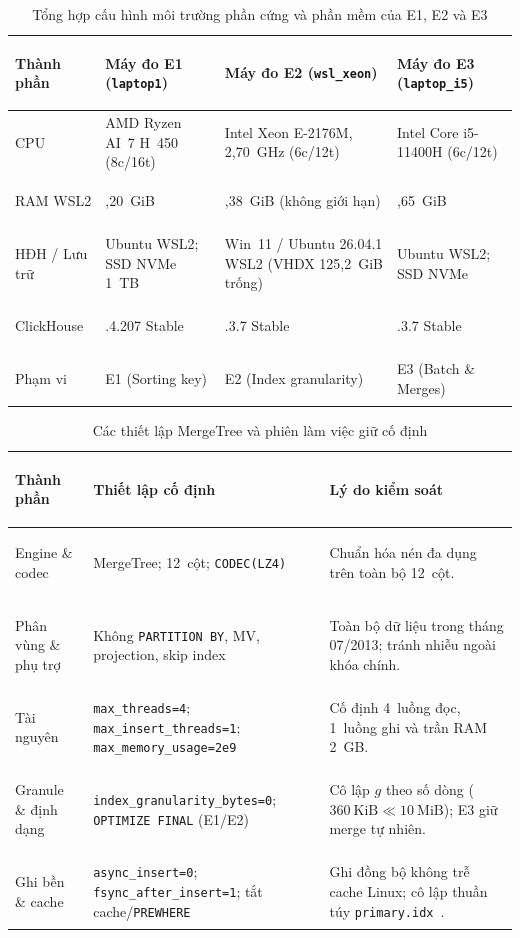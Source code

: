 \documentclass[13pt,a4paper]{report}
\begin{document}
\begin{table}[!htb]
\centering
\scriptsize
\renewcommand{\arraystretch}{1.08}
\caption{Tổng hợp cấu hình môi trường phần cứng và phần mềm của E1, E2 và E3}
\label{tab:env_setup}
\begin{tabularx}{\textwidth}{>{\bfseries\raggedright\arraybackslash}p{2.7cm} >{\raggedright\arraybackslash}X >{\raggedright\arraybackslash}X >{\raggedright\arraybackslash}X}
\toprule
\textbf{Thành phần} & \textbf{Máy đo E1 (\texttt{laptop1})} & \textbf{Máy đo E2 (\texttt{wsl\_\allowbreak{}xeon})} & \textbf{Máy đo E3 (\texttt{laptop\_\allowbreak{}i5})} \\
\midrule
CPU & AMD Ryzen AI~7 H~450 (8c/16t) & Intel Xeon E-2176M, 2,70~GHz (6c/12t) & Intel Core i5-11400H (6c/12t) \\
RAM WSL2 & 15,20~GiB & 15,38~GiB (không giới hạn) & 5,65~GiB \\
HĐH / Lưu trữ & Ubuntu WSL2; SSD NVMe 1~TB & Win~11 / Ubuntu 26.04.1 WSL2 (VHDX 125,2~GiB trống) & Ubuntu WSL2; SSD NVMe \\
ClickHouse & 26.10.4.207 Stable & 26.10.3.7 Stable & 26.10.3.7 Stable \\
Phạm vi & E1 (Sorting key) & E2 (Index granularity) & E3 (Batch \& Merges) \\
\bottomrule
\end{tabularx}
\end{table}

\begin{table}[!htb]
\centering
\scriptsize
\renewcommand{\arraystretch}{1.08}
\caption{Các thiết lập MergeTree và phiên làm việc giữ cố định}
\label{tab:fixed_settings}
\begin{tabularx}{\textwidth}{>{\bfseries\raggedright\arraybackslash}p{2.85cm} >{\raggedright\arraybackslash}p{4.55cm} >{\raggedright\arraybackslash}X}
\toprule
\textbf{Thành phần} & \textbf{Thiết lập cố định} & \textbf{Lý do kiểm soát} \\
\midrule
Engine \& codec & MergeTree; 12~cột; \texttt{CODEC(LZ4)}~\cite{M1} & Chuẩn hóa nén đa dụng trên toàn bộ 12~cột. \\
\addlinespace[2pt]
Phân vùng \& phụ trợ & Không \texttt{PARTITION BY}, MV, projection, skip index & Toàn bộ dữ liệu trong tháng 07/2013; tránh nhiễu ngoài khóa chính. \\
\addlinespace[2pt]
Tài nguyên & \texttt{max\_\allowbreak{}threads=4}; \texttt{max\_\allowbreak{}insert\_\allowbreak{}threads=1}; \texttt{max\_\allowbreak{}memory\_\allowbreak{}usage=2e9} & Cố định 4~luồng đọc, 1~luồng ghi và trần RAM 2~GB. \\
\addlinespace[2pt]
Granule \& định dạng & \texttt{index\_\allowbreak{}granularity\_\allowbreak{}bytes=0}; \texttt{OPTIMIZE FINAL} (E1/E2) & Cô lập $g$ theo số dòng ($360~\text{KiB} \ll 10~\text{MiB}$); E3 giữ merge tự nhiên. \\
\addlinespace[2pt]
Ghi bền \& cache & \texttt{async\_\allowbreak{}insert=0}; \texttt{fsync\_\allowbreak{}after\_\allowbreak{}insert=1}; tắt cache/\texttt{PREWHERE} & Ghi đồng bộ không trễ cache Linux; cô lập thuần túy \texttt{primary.idx}~\cite{S13}. \\
\bottomrule
\end{tabularx}
\end{table}
\end{document}

